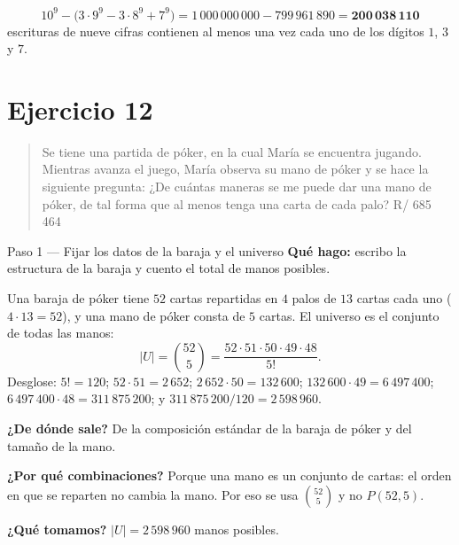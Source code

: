 \documentclass[11pt]{article}
\begin{document}
\begin{resp}
\[
10^{9} - \bigl(3\cdot 9^{9} - 3\cdot 8^{9} + 7^{9}\bigr) = 1\,000\,000\,000 - 799\,961\,890 = \mathbf{200\,038\,110}
\]
escrituras de nueve cifras contienen al menos una vez cada uno de los dígitos $1$, $3$ y $7$.
\end{resp}

\section*{Ejercicio 12}

\begin{quote}
Se tiene una partida de póker, en la cual María se encuentra jugando. Mientras avanza el juego, María observa su mano de póker y se hace la siguiente pregunta: ¿De cuántas maneras se me puede dar una mano de póker, de tal forma que al menos tenga una carta de cada palo? \hfill R/ 685 464
\end{quote}

\begin{paso}{Paso 1 --- Fijar los datos de la baraja y el universo}
\textbf{Qué hago:} escribo la estructura de la baraja y cuento el total de manos posibles.

Una baraja de póker tiene $52$ cartas repartidas en $4$ palos de $13$ cartas cada uno ($4\cdot 13 = 52$), y una mano de póker consta de $5$ cartas. El universo es el conjunto de todas las manos:
\[
|U| = \binom{52}{5} = \frac{52\cdot 51\cdot 50\cdot 49\cdot 48}{5!} .
\]
Desglose: $5! = 120$; $52\cdot 51 = 2\,652$; $2\,652\cdot 50 = 132\,600$; $132\,600\cdot 49 = 6\,497\,400$; $6\,497\,400\cdot 48 = 311\,875\,200$; y $311\,875\,200/120 = 2\,598\,960$.

\textbf{¿De dónde sale?} De la composición estándar de la baraja de póker y del tamaño de la mano.

\textbf{¿Por qué combinaciones?} Porque una mano es un conjunto de cartas: el orden en que se reparten no cambia la mano. Por eso se usa $\binom{52}{5}$ y no $P(52,5)$.

\textbf{¿Qué tomamos?} $|U| = 2\,598\,960$ manos posibles.
\end{paso}
\end{document}
